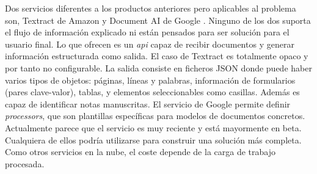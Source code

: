 Dos servicios diferentes a los productos anteriores pero aplicables al problema son, Textract de Amazon \cite{solucionesComerciales_amazon_textract} y Document AI de Google \cite{solucionesComerciales_google_documentAI}. Ninguno de los dos suporta el flujo de información explicado ni están pensados para ser solución para el usuario final. Lo que ofrecen es un \emph{\acrlong{api}} capaz de recibir documentos y generar información estructurada como salida. El caso de Textract es totalmente opaco y por tanto no configurable. La salida consiste en ficheros JSON donde puede haber varios tipos de objetos: páginas, líneas y palabras, información de formularios (pares clave-valor), tablas, y elementos seleccionables como casillas. Además es capaz de identificar notas manuscritas. El servicio de Google permite definir \emph{processors}, que son plantillas específicas para modelos de documentos concretos. Actualmente parece que el servicio es muy reciente y está mayormente en beta. Cualquiera de ellos podría utilizarse para construir una solución más completa. Como otros servicios en la nube, el coste depende de la carga de trabajo procesada.
